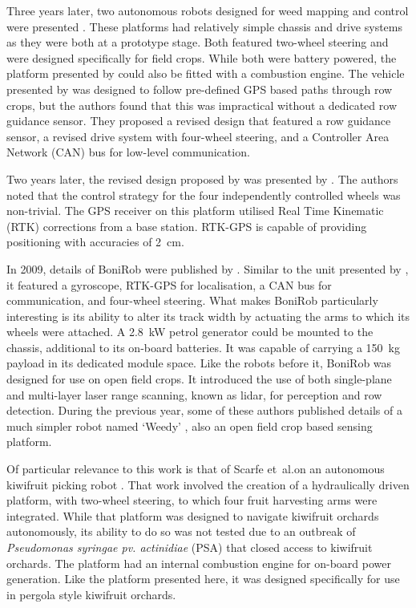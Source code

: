 \documentclass[preprint,authoryear,12pt]{elsarticle}
\begin{document}
        Three years later, two autonomous robots designed for weed mapping and control were presented \citep{Pedersen2002,Astrand2002}.
        These platforms had relatively simple chassis and drive systems as they were both at a prototype stage.
        Both featured two-wheel steering and were designed specifically for field crops.
        While both were battery powered, the platform presented by \cite{Astrand2002} could also be fitted with a combustion engine.
        The vehicle presented by \cite{Pedersen2002} was designed to follow pre-defined GPS based paths through row crops, but the authors found that this was impractical without a dedicated row guidance sensor.
        They proposed a revised design that featured a row guidance sensor, a revised drive system with four-wheel steering, and a Controller Area Network (CAN) bus for low-level communication.

        Two years later, the revised design proposed by \cite{Pedersen2002} was presented by \cite{Bak2004}.
        The authors noted that the control strategy for the four independently controlled wheels was non-trivial.
        The GPS receiver on this platform utilised Real Time Kinematic (RTK) corrections from a base station.
        RTK-GPS is capable of providing positioning with accuracies of \SI{2}{\centi\meter}.

        In 2009, details of BoniRob were published by \cite{Ruckelshausen2009}.
        Similar to the unit presented by \cite{Bak2004}, it featured a gyroscope, RTK-GPS for localisation, a CAN bus for communication, and four-wheel steering.
        What makes BoniRob particularly interesting is its ability to alter its track width by actuating the arms to which its wheels were attached.
        A \SI{2.8}{\kilo\watt} petrol generator could be mounted to the chassis, additional to its on-board batteries.
        It was capable of carrying a \SI{150}{\kilo\gram} payload in its dedicated module space.
        Like the robots before it, BoniRob was designed for use on open field crops.
        It introduced the use of both single-plane and multi-layer laser range scanning, known as lidar, for perception and row detection.
        During the previous year, some of these authors published details of a much simpler robot named `Weedy' \citep{Klose2008}, also an open field crop based sensing platform.

        Of particular relevance to this work is that of Scarfe et~al.\@ on an autonomous kiwifruit picking robot \citep{scarfe2009, Scarfe2012}.
        That work involved the creation of a hydraulically driven platform, with two-wheel steering, to which four fruit harvesting arms were integrated.
        While that platform was designed to navigate kiwifruit orchards autonomously, its ability to do so was not tested due to an outbreak of \textit{Pseudomonas syringae pv. actinidiae} (PSA) that closed access to kiwifruit orchards.
        The platform had an internal combustion engine for on-board power generation.
        Like the platform presented here, it was designed specifically for use in pergola style kiwifruit orchards.
\end{document}
